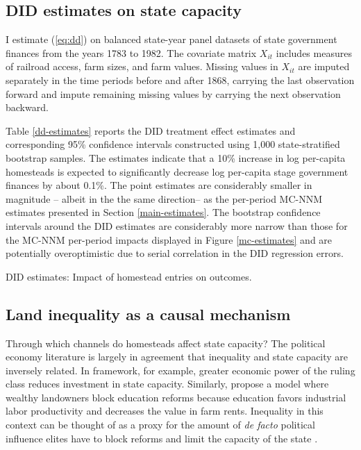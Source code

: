 \subsection{DID estimates on state capacity}

I estimate (\ref{eq:dd}) on balanced state-year panel datasets of state government finances from the years 1783 to 1982. The covariate matrix $X_{it}$ includes measures of railroad access, farm sizes, and farm values. Missing values in $X_{it}$ are imputed separately in the time periods before and after 1868, carrying the last observation forward and impute remaining missing values by carrying the next observation backward.

Table \ref{dd-estimates} reports the DID treatment effect estimates and corresponding 95\% confidence intervals constructed using 1,000 state-stratified bootstrap samples. The estimates indicate that a 10\% increase in log per-capita homesteads is expected to significantly decrease log per-capita stage government finances by about 0.1\%. The point estimates are considerably smaller in magnitude -- albeit in the the same direction-- as the per-period MC-NNM estimates presented in Section \ref{main-estimates}. The bootstrap confidence intervals around the DID estimates are considerably more narrow than those for the MC-NNM per-period impacts displayed in Figure \ref{mc-estimates} and are potentially overoptimistic due to serial correlation in the DID regression errors.

\begin{table}[htbp]
	\begin{center}
		\caption{DID estimates: Impact of homestead entries on outcomes. \label{dd-estimates}}
		\resizebox{.9\width}{!}{}
	\end{center}
\end{table}

\subsection{Land inequality as a causal mechanism}  \label{mechanisms}

Through which channels do homesteads affect state capacity? The political economy literature is largely in agreement that inequality and state capacity are inversely related. In  framework, for example, greater economic power of the ruling class reduces investment in state capacity. Similarly, \citet{galor2009inequality} propose a model where wealthy landowners block education reforms because education favors industrial labor productivity and decreases the value in farm rents. Inequality in this context can be thought of as a proxy for the amount of \emph{de facto} political influence elites have to block reforms and limit the capacity of the state \citep{acemoglu2008persistence}. 


